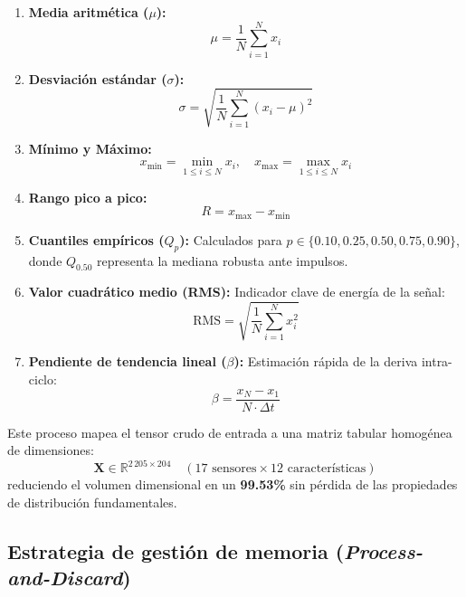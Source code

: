 \documentclass[journal]{IEEEtran}
\begin{document}
\begin{enumerate}[leftmargin=*]
    \item \textbf{Media aritmética ($\mu$):}
    \begin{equation}
        \mu = \frac{1}{N}\sum_{i=1}^N x_i
    \end{equation}
    \item \textbf{Desviación estándar ($\sigma$):}
    \begin{equation}
        \sigma = \sqrt{\frac{1}{N}\sum_{i=1}^N (x_i - \mu)^2}
    \end{equation}
    \item \textbf{Mínimo y Máximo:}
    \begin{equation}
        x_{\min} = \min_{1 \le i \le N} x_i, \quad x_{\max} = \max_{1 \le i \le N} x_i
    \end{equation}
    \item \textbf{Rango pico a pico:}
    \begin{equation}
        R = x_{\max} - x_{\min}
    \end{equation}
    \item \textbf{Cuantiles empíricos ($Q_p$):} Calculados para $p \in \{0.10, 0.25, 0.50, 0.75, 0.90\}$, donde $Q_{0.50}$ representa la mediana robusta ante impulsos.
    \item \textbf{Valor cuadrático medio (RMS):} Indicador clave de energía de la señal:
    \begin{equation}
        \text{RMS} = \sqrt{\frac{1}{N}\sum_{i=1}^N x_i^2}
    \end{equation}
    \item \textbf{Pendiente de tendencia lineal ($\beta$):} Estimación rápida de la deriva intra-ciclo:
    \begin{equation}
        \beta = \frac{x_N - x_1}{N \cdot \Delta t}
    \end{equation}
\end{enumerate}

Este proceso mapea el tensor crudo de entrada a una matriz tabular homogénea de dimensiones:
\begin{equation}
    \mathbf{X} \in \mathbb{R}^{2\,205 \times 204} \quad (17 \text{ sensores} \times 12 \text{ características})
\end{equation}
reduciendo el volumen dimensional en un \textbf{99.53\%} sin pérdida de las propiedades de distribución fundamentales.

\subsection{Estrategia de gestión de memoria (\emph{Process-and-Discard})}
\end{document}
